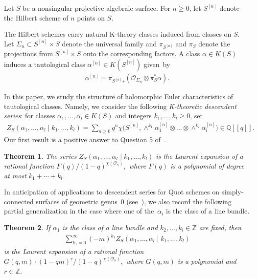 \documentclass[pdftex]{sigma}
\newtheorem{Theorem}{Theorem}[section]
\numberwithin{equation}{section}
\def\Q{\mathbb Q}
\def\Z{\mathbb Z}
\begin{document}
Let $S$ be a nonsingular projective algebraic surface. For $n\geq 0$, let $S^{[n]}$ denote the Hilbert scheme of $n$ points on $S$.

The Hilbert schemes carry natural K-theory classes induced from classes on $S$. Let $\Sigma_n\subset S^{[n]}\times S$ denote the universal family and $\pi_{S^{[n]}}$ and $\pi_S$ denote the projections from $S^{[n]}\times S$ onto the corresponding factors. A class $\alpha\in K(S)$ induces a tautological class $\alpha^{[n]}\in K(S^{[n]})$ given~by \begin{gather}\label{tautdef}
\alpha^{[n]}={\pi_{S^{[n]}}}_*(\mathcal{O}_{\Sigma_n}\otimes \pi_S^*\alpha ).
\end{gather}

In this paper, we study the structure of holomorphic Euler characteristics of tautological classes. Namely, we consider the following {\em K-theoretic descendent series}: for classes $\alpha_1,\dots,\alpha_l \in K(S)$ and integers $k_1,\dots,k_l\geq 0$, set \begin{align}\label{projseries}
Z_{S}(\alpha_1,\dots,\alpha_l\mid k_1,\dots,k_l)=\sum_{n\geq 0} q^n \chi\big(S^{[n]}, \wedge^{k_1} \alpha^{[n]}_1 \otimes \dots \otimes \wedge^{k_l} \alpha_l^{[n]} \big)\in \Q[[q]].
\end{align}
Our first result is a positive answer to Question 5 of~\cite{AJLOP}.

\begin{Theorem}\label{descrat}
The series $Z_{S}(\alpha_1,\dots,\alpha_l\mid k_1,\dots,k_l)$ is the Laurent expansion of a rational function $F(q)/(1-q)^{\chi(\mathcal{O}_S)},$ where $F(q)$ is a polynomial of degree at most $k_1+\cdots+k_l$.
\end{Theorem}

In anticipation of applications to descendent series for Quot schemes
on simply-connected surfaces of geometric genus~0 (see~\cite[Section~3.4]{AJLOP}), we also record the following partial generalization in the case where one of the~$\alpha_i$ is the class of a line bundle.

\begin{Theorem}\label{lbdescrat}
If $\alpha_1$ is the class of a line bundle and $k_2,\dots,k_l\in \Z$ are fixed, then
\begin{align}\label{lbspec}
\sum_{k_1=0}^{\infty} (-m)^{k_1} Z_{S}(\alpha_1,\dots,\alpha_l\mid k_1,\dots,k_l)
\end{align}
is the Laurent expansion of a rational function $G(q,m)\cdot (1-qm)^r/(1-q)^{\chi(\mathcal{O}_S)},$ where $G(q,m)$ is a polynomial and $r\in \Z$.
\end{Theorem}
\end{document}
